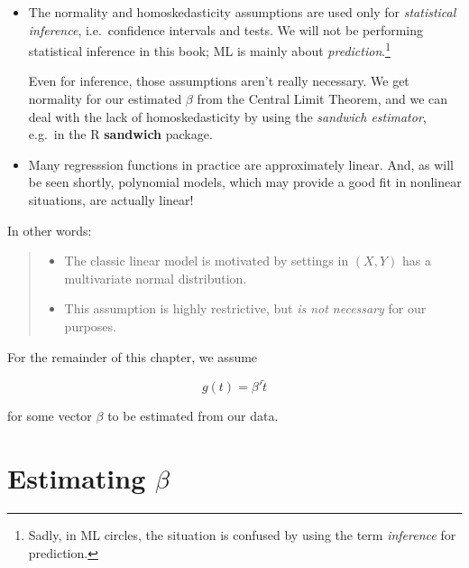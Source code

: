 \begin{itemize}

\item The normality and homoskedasticity assumptions are used only for
\textit{statistical inference}, i.e.\ confidence intervals and tests.
We will not be performing statistical inference in this
book; ML is mainly about \textit{prediction}.\footnote{Sadly, in ML
circles, the situation is confused by using the term \textit{inference}
for prediction.}  

Even for inference, those assumptions aren't really
necessary.  We get normality for our estimated $\beta$ from
the Central Limit Theorem, and we can deal with the lack of
homoskedasticity by using the \textit{sandwich estimator}, e.g.\ in the
R \textbf{sandwich} package. 

\item Many regresssion functions in practice are approximately linear.
And, as will be seen shortly, polynomial models, which may provide a
good fit in nonlinear situations, are actually linear!

\end{itemize} 

In other words:

\begin{quote}

\begin{itemize}

\item The classic linear model is motivated by settings in $(X,Y)$
has a multivariate normal distribution.

\item This assumption is highly restrictive, but \textit{is not
necessary} for our purposes.

\end{itemize} 

\end{quote}

For the remainder of this chapter, we assume 

\begin{equation}
\label{linassump}
g(t) = \beta' \widetilde{t}
\end{equation}

for some vector $\beta$ to be estimated from our data.

\section{Estimating $\beta$}


